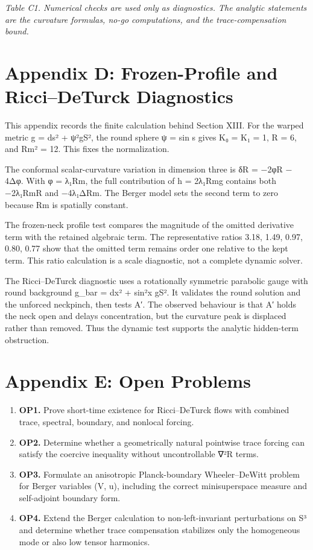 \documentclass[
]{article}
\begin{document}
\emph{Table C1. Numerical checks are used only as diagnostics. The analytic statements are the curvature formulas, no-go computations, and the trace-compensation bound.}

\section{Appendix D: Frozen-Profile and Ricci--DeTurck Diagnostics}\label{appendix-d-frozen-profile-and-riccideturck-diagnostics}

This appendix records the finite calculation behind Section XIII. For the warped metric g = ds² + ψ²gS², the round sphere ψ = sin s gives K₀ = K₁ = 1, R = 6, and \textbar Rm\textbar² = 12. This fixes the normalization.

The conformal scalar-curvature variation in dimension three is δR = −2φR − 4Δφ. With φ = λ₁\textbar Rm\textbar, the full contribution of h = 2λ₁\textbar Rm\textbar g contains both −2λ₁\textbar Rm\textbar R and −4λ₁Δ\textbar Rm\textbar. The Berger model sets the second term to zero because \textbar Rm\textbar{} is spatially constant.

The frozen-neck profile test compares the magnitude of the omitted derivative term with the retained algebraic term. The representative ratios 3.18, 1.49, 0.97, 0.80, 0.77 show that the omitted term remains order one relative to the kept term. This ratio calculation is a scale diagnostic, not a complete dynamic solver.

The Ricci--DeTurck diagnostic uses a rotationally symmetric parabolic gauge with round background g\_bar = dx² + sin²x gS². It validates the round solution and the unforced neckpinch, then tests A′. The observed behaviour is that A′ holds the neck open and delays concentration, but the curvature peak is displaced rather than removed. Thus the dynamic test supports the analytic hidden-term obstruction.

\section{Appendix E: Open Problems}\label{appendix-e-open-problems}

\begin{enumerate}
\def\labelenumi{(\arabic{enumi})}
\setcounter{enumi}{34}
\item
  \textbf{OP1.} Prove short-time existence for Ricci--DeTurck flows with combined trace, spectral, boundary, and nonlocal forcing.
\item
  \textbf{OP2.} Determine whether a geometrically natural pointwise trace forcing can satisfy the coercive inequality without uncontrollable ∇²R terms.
\item
  \textbf{OP3.} Formulate an anisotropic Planck-boundary Wheeler--DeWitt problem for Berger variables (V, u), including the correct minisuperspace measure and self-adjoint boundary form.
\item
  \textbf{OP4.} Extend the Berger calculation to non-left-invariant perturbations on S³ and determine whether trace compensation stabilizes only the homogeneous mode or also low tensor harmonics.
\end{enumerate}
\end{document}
